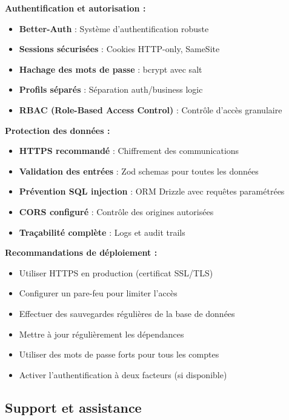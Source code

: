 \begin{tcolorbox}[colback=yellow!10!white,colframe=orange!75!black,title=Mesures de sécurité]

\textbf{Authentification et autorisation :}
\begin{itemize}[leftmargin=*]
    \item \textbf{Better-Auth} : Système d'authentification robuste
    \item \textbf{Sessions sécurisées} : Cookies HTTP-only, SameSite
    \item \textbf{Hachage des mots de passe} : bcrypt avec salt
    \item \textbf{Profils séparés} : Séparation auth/business logic
    \item \textbf{RBAC (Role-Based Access Control)} : Contrôle d'accès granulaire
\end{itemize}

\textbf{Protection des données :}
\begin{itemize}[leftmargin=*]
    \item \textbf{HTTPS recommandé} : Chiffrement des communications
    \item \textbf{Validation des entrées} : Zod schemas pour toutes les données
    \item \textbf{Prévention SQL injection} : ORM Drizzle avec requêtes paramétrées
    \item \textbf{CORS configuré} : Contrôle des origines autorisées
    \item \textbf{Traçabilité complète} : Logs et audit trails
\end{itemize}

\textbf{Recommandations de déploiement :}
\begin{itemize}[leftmargin=*]
    \item Utiliser HTTPS en production (certificat SSL/TLS)
    \item Configurer un pare-feu pour limiter l'accès
    \item Effectuer des sauvegardes régulières de la base de données
    \item Mettre à jour régulièrement les dépendances
    \item Utiliser des mots de passe forts pour tous les comptes
    \item Activer l'authentification à deux facteurs (si disponible)
\end{itemize}
\end{tcolorbox}

\subsection{Support et assistance}

